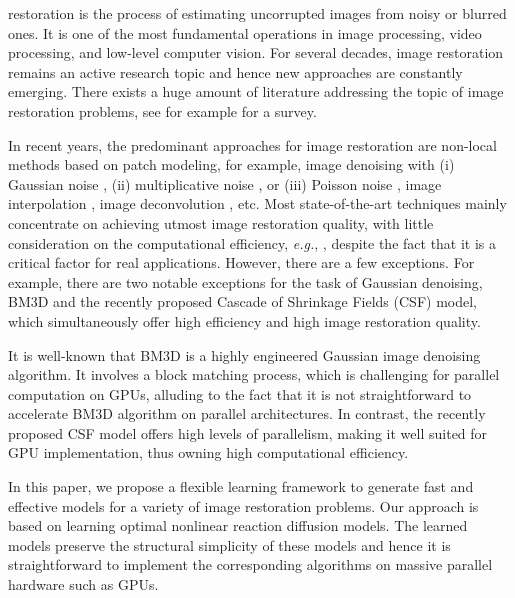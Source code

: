 \documentclass[10pt,journal,compsoc]{IEEEtran}
\newcommand{\eg}{\emph{e.g.}}
\begin{document}
\IEEEdisplaynontitleabstractindextext
\IEEEpeerreviewmaketitle

 restoration is the process of estimating uncorrupted images from
noisy or blurred ones. It is one of the most fundamental operations in
image processing, video processing, and low-level computer vision. 
For several decades, image restoration remains an active research topic and hence new 
approaches are constantly emerging. There exists a huge amount of literature addressing the topic of image
restoration problems, see for example \cite{milanfar2013tour} for a survey. 

In recent years, the predominant approaches for image restoration 
are non-local methods based on patch modeling, 
for example, image denoising with (i) Gaussian noise 
\cite{LSSC, WNNM, BM3D, rajwade2013image}, 
(ii) multiplicative noise \cite{CozzolinoPSPV14}, or (iii) 
Poisson noise \cite{Giryes}, 
image interpolation \cite{RomanoPE14}, 
image deconvolution \cite{dong2013nonlocally}, etc. 
Most state-of-the-art techniques mainly
concentrate on achieving utmost image restoration quality, with little 
consideration on the computational efficiency, 
\eg, \cite{LSSC, WNNM, RomanoPE14}, despite the fact that 
it is a critical factor for real applications. However, there are a few exceptions. For example, 
there are two notable exceptions for the task of Gaussian denoising, 
BM3D \cite{BM3D} and the recently proposed Cascade of Shrinkage Fields (CSF) 
\cite{CSF2014} model, which simultaneously offer high efficiency and high image restoration quality.

It is well-known that BM3D is a highly engineered Gaussian image
denoising algorithm. It involves a block matching process, which is
challenging for parallel computation on GPUs, alluding to the fact
that it is not straightforward to accelerate BM3D algorithm on
parallel architectures. In contrast, the recently proposed CSF model
offers high levels of parallelism, making it well suited for GPU
implementation, thus owning high computational efficiency.

In this paper, we propose a flexible learning framework to generate
fast and effective models for a variety of image restoration
problems. Our approach is based on learning optimal nonlinear
reaction diffusion models. The learned models preserve the structural
simplicity of these models and hence it is straightforward to
implement the corresponding algorithms on massive parallel hardware
such as GPUs.
\end{document}
